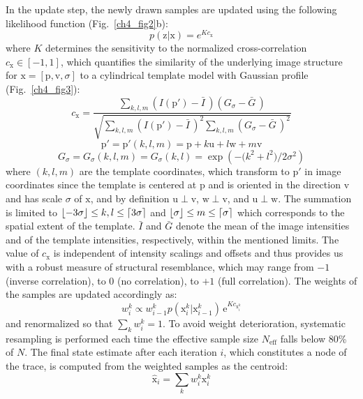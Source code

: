In the update step, the newly drawn samples are updated using the following likelihood function (Fig.~\ref{ch4_fig2}b):
\begin{equation}
p(\mathrm{z} | \mathrm{x}) = e^{K c_{\mathrm{x}}}
\end{equation}
where $K$ determines the sensitivity to the normalized cross-correlation $c_{\mathrm{x}}\in[-1,1]$, which quantifies the similarity of the underlying image structure for $\mathrm{x}=\left[ \mathrm{p}, \mathrm{v}, \sigma \right]$ to a cylindrical template model with Gaussian profile (Fig.~\ref{ch4_fig3}):
\begin{equation}
\label{eq:corr}
c_\mathrm{x} = 
\frac{
	\sum_{k,l,m}
	\left(I(\mathrm{p}')-\bar{I}\,\right) \left(G_{\sigma}-\bar{G}\,\right)
}{
	\!\!\sqrt{
		\sum_{k,l,m}\left(I(\mathrm{p}')-\bar{I}\,\right)^2
		\sum_{k,l,m}\left(G_{\sigma}-\bar{G}\,\right)^2}
}
\end{equation}
\begin{equation}
\label{eq:pp}
\mathrm{p}' = \mathrm{p}'(k,l,m) =  \mathrm{p} + k \mathrm{u} + l \mathrm{w} + m \mathrm{v}
\end{equation}
\begin{equation}
\label{eq:template}
G_{\sigma} = G_{\sigma}(k,l,m)=G_{\sigma}(k,l)=\exp\left(-\big(k^2+l^2\big)/2\sigma^2\right)
\end{equation} 
where $(k,l,m)$ are the template coordinates, which transform to $\mathrm{p}'$ in image coordinates since the template is centered at $\mathrm{p}$ and is oriented in the direction $\mathrm{v}$ and has  scale $\sigma$ of $\mathrm{x}$, and by definition $\mathrm{u} \! \perp \! \mathrm{v}$, $\mathrm{w} \! \perp \! \mathrm{v}$, and $\mathrm{u} \! \perp \! \mathrm{w}$. The summation is limited to $\floor*{-3\sigma} \leq k, l \leq \ceil*{3\sigma}$ and $\floor*{\sigma} \leq m \leq \ceil*{\sigma}$ which corresponds to the spatial extent of the template. $\bar{I}$ and $\bar{G}$ denote the mean of the image intensities and of the template intensities, respectively, within the mentioned limits. The value of $c_\mathrm{x}$ is independent of intensity scalings and offsets and thus provides us with a robust measure of structural resemblance, which may range from $-1$ (inverse correlation), to $0$ (no correlation), to $+1$ (full correlation). The weights of the samples are updated accordingly as:
\begin{equation} 
\label{eq:w-update}
w_i^k \propto w_{i-1}^k
p(\mathrm{x}_{i}^k | \mathrm{x}_{i-1}^k)
\,\textrm{e}^{K c_{\mathrm{x}_i^k}}
\end{equation}
and renormalized so that $\sum_k w_i^k = 1$. To avoid weight deterioration, systematic resampling \cite{kitagawa1996monte} is performed each time the effective sample size $N_{\text{eff}}$ \cite{kong1994sequential} falls below 80\% of $N$. The final state estimate after each iteration $i$, which constitutes a node of the trace, is computed from the weighted samples as the centroid:
\begin{equation} 
\hat{\mathrm{x}}_i = \sum_k w_i^k \mathrm{x}_i^k
\end{equation} 

